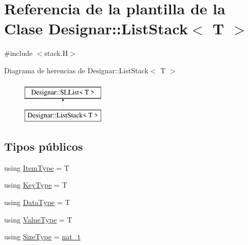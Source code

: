 \hypertarget{class_designar_1_1_list_stack}{}\section{Referencia de la plantilla de la Clase Designar\+:\+:List\+Stack$<$ T $>$}
\label{class_designar_1_1_list_stack}


{\ttfamily \#include $<$stack.\+H$>$}

Diagrama de herencias de Designar\+:\+:List\+Stack$<$ T $>$\begin{figure}[H]
\begin{center}
\leavevmode
\includegraphics[height=2.000000cm]{class_designar_1_1_list_stack}
\end{center}
\end{figure}
\subsection*{Tipos públicos}
\begin{DoxyCompactItemize}
\item 
using \hyperlink{class_designar_1_1_list_stack_a5a584752d4cfca9e791071f1553d7c69}{Item\+Type} = T
\item 
using \hyperlink{class_designar_1_1_list_stack_adf88da10e96a685fa2cdd3fff029d52c}{Key\+Type} = T
\item 
using \hyperlink{class_designar_1_1_list_stack_a9bdd8f2e28bca0397b835faa08a1d0dc}{Data\+Type} = T
\item 
using \hyperlink{class_designar_1_1_list_stack_ac51dd165958a3e9ff0790e9f5791a4a5}{Value\+Type} = T
\item 
using \hyperlink{class_designar_1_1_list_stack_ae1849f2d4064bd8602122eb9db436441}{Size\+Type} = \hyperlink{namespace_designar_aa72662848b9f4815e7bf31a7cf3e33d1}{nat\+\_\+t}
\end{DoxyCompactItemize}
